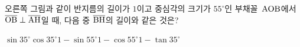 \noindent\begin{minipage}[t]{0.58\linewidth}\vspace{0pt}\raggedright 오른쪽 그림과 같이 반지름의 길이가 $1$이고 중심각의 크기가 $55^\circ$인 부채꼴~$\mathrm{AOB}$에서 $\overline{\mathrm{OB}}\perp\overline{\mathrm{AH}}$일 때, 다음 중 $\overline{\mathrm{BH}}$의 길이와 같은 것은?\end{minipage}\hfill\begin{minipage}[t]{0.4\linewidth}\vspace{0pt}\centering \resizebox{\ifdim\width>\linewidth\linewidth\else\width\fi}{!}{}\end{minipage}\par
\begin{choices32}{$\sin 35^\circ$}{$\cos 35^\circ$}{$1-\sin 55^\circ$}{$1-\cos 55^\circ$}{$1-\tan 35^\circ$}\end{choices32}
